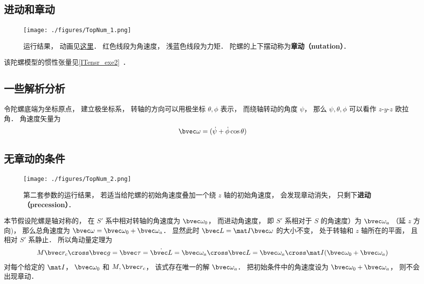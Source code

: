 
\begin{issues}
\issueDraft
\end{issues}


\subsection{进动和章动}

\begin{figure}[ht]
\centering
\texttt{[image: ./figures/TopNum\_1.png]}
\caption{运行结果， 动画见\href{https://wuli.wiki/apps/Top.html}{这里}． 红色线段为角速度， 浅蓝色线段为力矩． 陀螺的上下摆动称为\textbf{章动（nutation）}．} \label{TopNum_fig1}
\end{figure}

该陀螺模型的惯性张量见\autoref{ITensr_exe2}~．

\subsection{一些解析分析}
令陀螺底端为坐标原点， 建立极坐标系， 转轴的方向可以用极坐标 $\theta, \phi$ 表示， 而绕轴转动的角度 $\psi$， 那么 $\psi, \theta, \phi$ 可以看作 $z$-$y$-$z$ 欧拉角． 角速度矢量为
\begin{equation}
\bvec\omega = (\dot\psi + \dot\phi\cos\theta)
\end{equation}


\subsection{无章动的条件}

\begin{figure}[ht]
\centering
\texttt{[image: ./figures/TopNum\_2.png]}
\caption{第二套参数的运行结果， 若适当给陀螺的初始角速度叠加一个绕 $z$ 轴的初始角速度， 会发现章动消失， 只剩下\textbf{进动（precession）}．} \label{TopNum_fig2}
\end{figure}

本节假设陀螺是轴对称的， 在 $S'$ 系中相对转轴的角速度为 $\bvec\omega_0$， 而进动角速度， 即 $S'$ 系相对于 $S$ 的角速度）为 $\bvec\omega_a$ （延 $z$ 方向)， 那么总角速度为 $\bvec\omega = \bvec\omega_0 + \bvec\omega_a$． 显然此时 $\bvec L = \mat I \bvec\omega$ 的大小不变， 处于转轴和 $z$ 轴所在的平面， 且相对 $S'$ 系静止． 所以角动量定理为
\begin{equation}\label{TopNum_eq1}
M\bvec r_c\cross \bvec g = \bvec\tau = \dot{\bvec L} = \bvec\omega_a\cross\bvec L = \bvec\omega_a\cross \mat I (\bvec\omega_0 + \bvec\omega_a)
\end{equation}
对每个给定的 $\mat I$， $\bvec\omega_0$ 和 $M, \bvec r_c$， 该式存在唯一的解 $\bvec\omega_a$． 把初始条件中的角速度设为 $\bvec\omega_0 + \bvec\omega_a$， 则不会出现章动．


